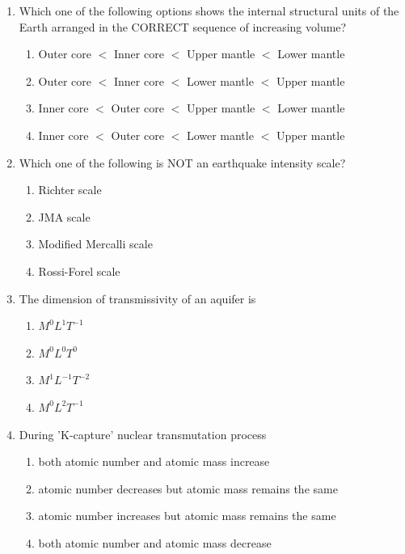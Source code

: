 \documentclass[journal,12pt,onecolumn]{IEEEtran}
\begin{document}
\begin{enumerate}
\item Which one of the following options shows the internal structural units of the Earth arranged in the CORRECT sequence of increasing volume?

\hfill{}
\begin{enumerate}
    \item Outer core $<$ Inner core $<$ Upper mantle $<$ Lower mantle
    \item Outer core $<$ Inner core $<$ Lower mantle $<$ Upper mantle
    \item Inner core $<$ Outer core $<$ Upper mantle $<$ Lower mantle
    \item Inner core $<$ Outer core $<$ Lower mantle $<$ Upper mantle
\end{enumerate}

\item Which one of the following is NOT an earthquake intensity scale?

\hfill{}
\begin{multicols}{2}
\begin{enumerate}
    \item Richter scale
    \item JMA scale
    \item Modified Mercalli scale
    \item Rossi-Forel scale
\end{enumerate}
\end{multicols}

\item The dimension of transmissivity of an aquifer is

\hfill{}
\begin{multicols}{2}
\begin{enumerate}
    \item $M^{0}L^{1}T^{-1}$
    \item $M^{0}L^{0}T^{0}$
    \item $M^{1}L^{-1}T^{-2}$
    \item $M^{0}L^{2}T^{-1}$
\end{enumerate}
\end{multicols}




\item During 'K-capture' nuclear transmutation process

\hfill{}
\begin{enumerate}
    \item both atomic number and atomic mass increase
    \item atomic number decreases but atomic mass remains the same
    \item atomic number increases but atomic mass remains the same
    \item both atomic number and atomic mass decrease
\end{enumerate}


\end{enumerate}
\end{document}
